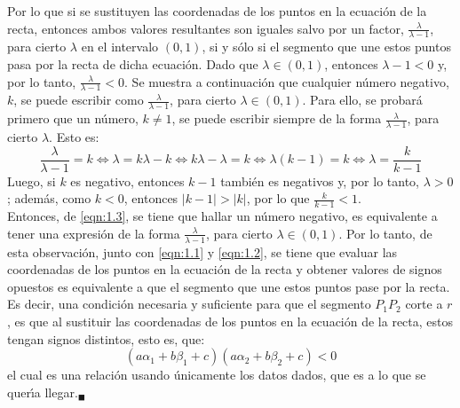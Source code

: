 \begin{solucion}
 \par
 Por lo que si se sustituyen las coordenadas de los puntos
 en la ecuaci\'on de la recta, entonces ambos valores
 resultantes son iguales salvo por un factor,
 $\frac{\lambda}{\lambda-1}$, para cierto $\lambda$ en el intervalo $(0,1)$, si y s\'olo si
 el segmento que une estos puntos pasa por la recta
 de dicha ecuaci\'on.
 Dado que $\lambda \in (0,1)$, entonces $\lambda - 1 < 0$ 
 y, por lo tanto, $\frac{\lambda}{\lambda-1} < 0$.
 Se muestra a continuaci\'on que cualquier n\'umero negativo, $k$,
 se puede escribir como $\frac{\lambda}{\lambda-1}$, 
 para cierto $\lambda\in(0,1)$.
 Para ello, se probar\'a primero que un n\'umero, $k \neq 1$,
 se puede escribir siempre de la forma
 $\frac{\lambda}{\lambda-1}$, para cierto $\lambda$.
 Esto es:
 \begin{equation}
  \label{eqn:1.3}
  \frac{\lambda}{\lambda-1} = k
  \Leftrightarrow \lambda = k\lambda - k
  \Leftrightarrow k\lambda - \lambda = k
  \Leftrightarrow \lambda(k-1) = k
  \Leftrightarrow \lambda = \frac{k}{k-1}
 \end{equation}
 Luego, si $k$ es negativo, entonces $k-1$ tambi\'en
 es negativos y, por lo tanto, $\lambda > 0$;
 adem\'as, como $k < 0$, entonces $|k-1| > |k|$,
 por lo que $\frac{k}{k-1} < 1$. \\
 Entonces, de \eqref{eqn:1.3}, se tiene
 que hallar un n\'umero negativo, es equivalente
 a tener una expresi\'on de la forma
 $\frac{\lambda}{\lambda-1}$, para cierto $\lambda \in (0,1)$.
 Por lo tanto, de esta observaci\'on,
 junto con \eqref{eqn:1.1} y \eqref{eqn:1.2},
 se tiene que evaluar las coordenadas de los puntos
 en la ecuaci\'on de la recta
 y obtener valores de signos opuestos es equivalente
 a que el segmento que une estos puntos pase por la recta.
 Es decir, una condici\'on necesaria y suficiente
 para que el segmento $P_1P_2$ corte a $r$,
 es que al sustituir las coordenadas de los puntos en la ecuaci\'on de la recta, estos tengan signos distintos, esto es, que:
 \begin{equation*}
  \left( a\alpha_1 + b\beta_1 + c \right)
  \left( a\alpha_2 + b\beta_2 + c \right) < 0
 \end{equation*}
 el cual es una relaci\'on usando \'unicamente los datos dados, 
 que es a lo que se quer\'{\i}a llegar.${}_{\blacksquare}$
 

\end{solucion}

